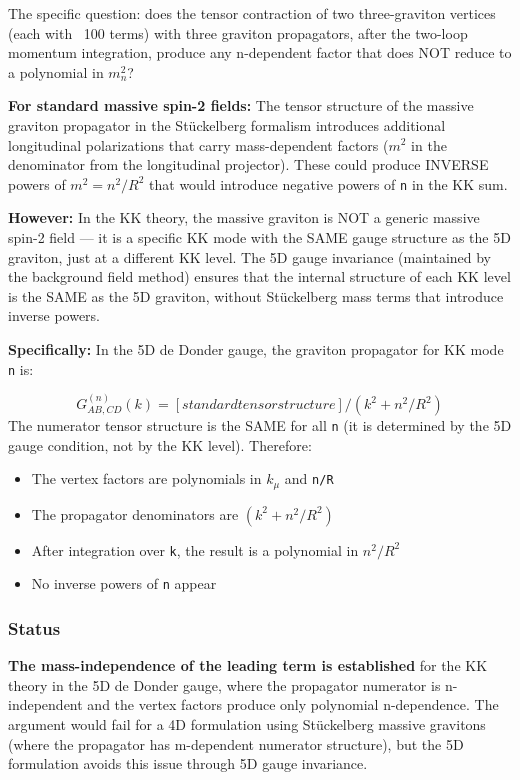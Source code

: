 \documentclass[aps,prd,preprint,superscriptaddress,longbibliography,floatfix]{revtex4-2}
\theoremstyle{remark}
\begin{document}
The specific question: does the tensor contraction of two three-graviton vertices (each with ~100 terms) with three graviton propagators, after the two-loop momentum integration, produce any n-dependent factor that does NOT reduce to a polynomial in $m_n^{2}$?

\textbf{For standard massive spin-2 fields:} The tensor structure of the massive graviton propagator in the St\"{u}ckelberg formalism introduces additional longitudinal polarizations that carry mass-dependent factors ($m^{2}$ in the denominator from the longitudinal projector). These could produce INVERSE powers of $m^{2} = n^{2}/R^{2}$ that would introduce negative powers of \texttt{n} in the KK sum.

\textbf{However:} In the KK theory, the massive graviton is NOT a generic massive spin-2 field --- it is a specific KK mode with the SAME gauge structure as the 5D graviton, just at a different KK level. The 5D gauge invariance (maintained by the background field method) ensures that the internal structure of each KK level is the SAME as the 5D graviton, without St\"{u}ckelberg mass terms that introduce inverse powers.

\textbf{Specifically:} In the 5D de Donder gauge, the graviton propagator for KK mode \texttt{n} is:


\begin{equation}
    G_{AB,CD}^{(n)}(k) = [standard tensor structure] / (k^{2} + n^{2}/R^{2})
\end{equation}
The numerator tensor structure is the SAME for all \texttt{n} (it is determined by the 5D gauge condition, not by the KK level). Therefore:


\begin{itemize}
  \item The vertex factors are polynomials in $k_\mu$ and \texttt{n/R}
  \item The propagator denominators are $(k^{2} + n^{2}/R^{2})$
  \item After integration over \texttt{k}, the result is a polynomial in $n^{2}/R^{2}$
  \item No inverse powers of \texttt{n} appear
\end{itemize}


\subsubsection{Status}

\textbf{The mass-independence of the leading term is established} for the KK theory in the 5D de Donder gauge, where the propagator numerator is n-independent and the vertex factors produce only polynomial n-dependence. The argument would fail for a 4D formulation using St\"{u}ckelberg massive gravitons (where the propagator has m-dependent numerator structure), but the 5D formulation avoids this issue through 5D gauge invariance.
\end{document}
